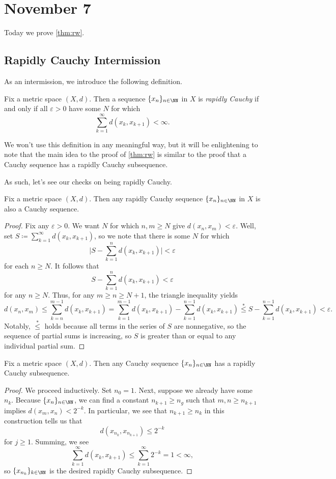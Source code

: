 \documentclass[../notes.tex]{subfiles}
\begin{document}
\section{November 7}

Today we prove \autoref{thm:rw}.

\subsection{Rapidly Cauchy Intermission}
As an intermission, we introduce the following definition.
\begin{definition}
	Fix a metric space $(X,d)$. Then a sequence $\{x_n\}_{n\in\NN}$ in $X$ is \textit{rapidly Cauchy} if and only if all $\varepsilon>0$ have some $N$ for which
	\[\sum_{k=1}^\infty d(x_k,x_{k+1})<\infty.\]
\end{definition}
We won't use this definition in any meaningful way, but it will be enlightening to note that the main idea to the proof of \autoref{thm:rw} is similar to the proof that a Cauchy sequence has a rapidly Cauchy subsequence.

As such, let's see our checks on being rapidly Cauchy.
\begin{lemma}
	Fix a metric space $(X,d)$. Then any rapidly Cauchy sequence $\{x_n\}_{n\in\NN}$ in $X$ is also a Cauchy sequence.
\end{lemma}
\begin{proof}
	Fix any $\varepsilon>0$. We want $N$ for which $n,m\ge N$ give $d(x_n,x_m)<\varepsilon$. Well, set $S\coloneqq\sum_{k=1}^\infty d(x_k,x_{k+1})$, so we note that there is some $N$ for which
	\[\Bigg|S-\sum_{k=1}^nd(x_k,x_{k+1})\Bigg|<\varepsilon\]
	for each $n\ge N$. It follows that
	\[S-\sum_{k=1}^nd(x_k,x_{k+1})<\varepsilon\]
	for any $n\ge N$. Thus, for any $m\ge n\ge N+1$, the triangle inequality yields
	\[d(x_n,x_m)\le\sum_{k=n}^{m-1}d(x_k,x_{k+1})=\sum_{k=1}^{m-1}d(x_k,x_{k+1})-\sum_{k=1}^{n-1}d(x_k,x_{k+1})\stackrel*\le S-\sum_{k=1}^{n-1}d(x_k,x_{k+1})<\varepsilon.\]
	Notably, $\stackrel*\le$ holds because all terms in the series of $S$ are nonnegative, so the sequence of partial sums is increasing, so $S$ is greater than or equal to any individual partial sum.
\end{proof}
\begin{proposition} \label{prop:cauchy-has-rapidly-cauchy}
	Fix a metric space $(X,d)$. Then any Cauchy sequence $\{x_n\}_{n\in\NN}$ has a rapidly Cauchy subsequence.
\end{proposition}
\begin{proof}
	We proceed inductively. Set $n_0=1$. Next, suppose we already have some $n_k$. Because $\{x_n\}_{n\in\NN}$, we can find a constant $n_{k+1}\ge n_g$ such that $m,n\ge n_{k+1}$ implies $d(x_m,x_n)<2^{-k}$. In particular, we see that $n_{k+1}\ge n_k$ in this construction tells us that
	\[d(x_{n_k},x_{n_{k+1}})\le 2^{-k}\]
	for $j\ge1$. Summing, we see
	\[\sum_{k=1}^\infty d(x_k,x_{k+1})\le\sum_{k=1}^\infty2^{-k}=1<\infty,\]
	so $\{x_{n_k}\}_{k\in\NN}$ is the desired rapidly Cauchy subsequence.
\end{proof}
\end{document}
